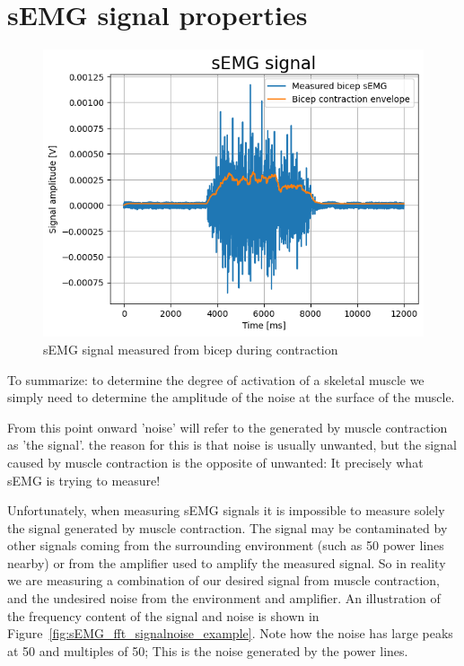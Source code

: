 \section{sEMG signal properties}
\begin{figure}[h!t]
	\begin{center}
		\includegraphics[width=0.7\columnwidth]{images/sEMG_signal_example.png}
	\end{center}
	\caption{sEMG signal measured from bicep during contraction}
	\label{fig:sEMG_signal_example}
\end{figure}

To summarize: to determine the degree of activation of a skeletal muscle we simply need to determine the amplitude of the noise at the surface of the muscle.

From this point onward 'noise' will refer to the generated by muscle contraction as 'the signal'. the reason for this is that noise is usually unwanted, but the signal caused by muscle contraction is the opposite of unwanted: It precisely what sEMG is trying to measure! 

Unfortunately, when measuring sEMG signals it is impossible to measure solely the signal generated by muscle contraction. The signal may be contaminated by other signals coming from the surrounding environment (such as \SI{50}{\Hertz} power lines nearby) or from the amplifier used to amplify the measured signal. So in reality we are measuring a combination of our desired signal from muscle contraction, and the undesired noise from the environment and amplifier. An illustration of the frequency content of the signal and noise is shown in Figure~\ref{fig:sEMG_fft_signalnoise_example}. Note how the noise has large peaks at \SI{50}{\Hertz} and multiples of \SI{50}{\Hertz}; This is the noise generated by the power lines. 

